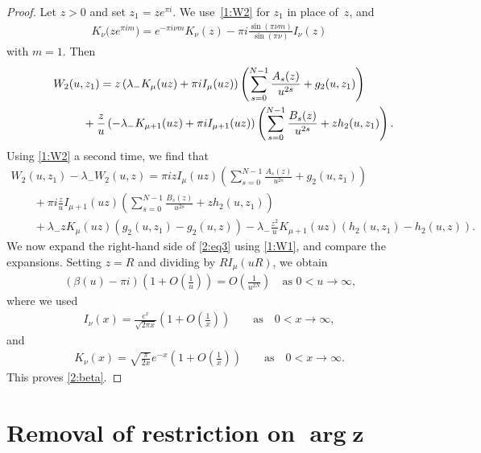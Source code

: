 \documentclass[11pt]{article}
\numberwithin{equation}{section}
\begin{document}
\begin{proof}
Let $z>0$ and set $z_1=ze^{\pi i}$.
We use~\eqref{1:W2} for $z_1$ in place of~$z$, and \cite[(10.34.2)]{NIST}
\begin{gather}\label{3:ancontK}
K_\nu\big(ze^{\pi im}\big)= e^{-\pi i \nu m}K_\nu(z)-\pi i \frac{\sin(\pi \nu m)}{\sin(\pi \nu)} I_\nu(z)
\end{gather}
with $m=1$. Then
\begin{gather*}
 W_2(u,z_1) = z\left(\lambda_-K_\mu(uz)+\pi i I_\mu(uz)\right)\left(\sum_{s=0}^{N-1}\frac{A_s(z)}{u^{2s}}+g_2(u,z_1)\right)\\
\hphantom{W_2(u,z_1) =}{} +\frac{z}{u}\left(-\lambda_-K_{\mu+1}(uz)+\pi i I_{\mu+1}(uz)\right) \left(\sum_{s=0}^{N-1}\frac{B_s(z)}{u^{2s}}+zh_2(u,z_1)\right).
\end{gather*}
Using \eqref{1:W2} a second time, we f\/ind that
\begin{gather*}
 W_2(u,z_1)-\lambda_-W_2(u,z)=\pi i zI_\mu(uz)\left(\sum_{s=0}^{N-1}\frac{A_s(z)}{u^{2s}}+g_2(u,z_1)\right)\\
\qquad{}
+\pi i\frac{z}{u}I_{\mu+1}(uz) \left(\sum_{s=0}^{N-1}\frac{B_s(z)}{u^{2s}}+zh_2(u,z_1)\right)\\
\qquad{}
+\lambda_- zK_\mu(uz) (g_2(u,z_1)-g_2(u,z))-\lambda_-\frac{z^2}{u}K_{\mu+1}(uz)(h_2(u,z_1)-h_2(u,z)).
\end{gather*}
We now expand the right-hand side of \eqref{2:eq3} using \eqref{1:W1}, and compare the expansions.
Setting $z=R$ and dividing by $R I_\mu(uR)$, we obtain
\begin{gather*}
 (\beta(u)-\pi i) \left(1+O\left(\frac1u\right)\right)=O\left(\frac{1}{u^{2N}}\right) \quad \text{as $0<u\to\infty$,}
\end{gather*}
where we used \cite[(10.40.1)]{NIST}
\begin{gather}\label{2:asyI}
 I_\nu(x)=\frac{e^x}{\sqrt{2\pi x}}\left(1+O\left(\frac1x\right)\right)\qquad\text{as} \quad 0<x\to\infty,
\end{gather}
and \cite[(10.40.2)]{NIST}
\begin{gather}\label{2:asyK}
 K_\nu(x)=\sqrt{\frac\pi{2x}}e^{-x}\left(1+O\left(\frac1x\right)\right)\qquad\text{as} \quad 0<x\to\infty.
\end{gather}
This proves \eqref{2:beta}.
\end{proof}
\setcounter{section}{3}
\setcounter{subsection}{0}
\setcounter{subsubsection}{0}
\setcounter{Theorem}{4}
\setcounter{equation}{15}
\section[Removal of restriction on $\arg z$]{Removal of restriction on $\boldsymbol{\arg z}$}\label{removal}
\end{document}
